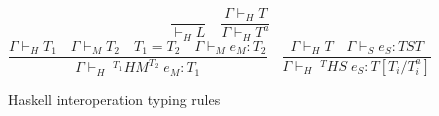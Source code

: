 \begin{figure}
\[
\frac{}{\vdash_{H}L}
\quad
\frac{\Gamma\vdash_{H}T}{\Gamma\vdash_{H}T^{a}}
\]
\bigskip
\[
\frac{\Gamma\vdash_{H}T_{1}\quad\Gamma\vdash_{M}T_{2}\quad T_{1}=T_{2}\quad\Gamma\vdash_{M}e_{M}:T_{2}}{\Gamma\vdash_{H}\;^{T_{1}}HM^{T_{2}}\;e_{M}:T_{1}}
\quad
\frac{\Gamma\vdash_{H}T\quad\Gamma\vdash_{S}e_{S}:TST}{\Gamma\vdash_{H}\;^{T}HS\;e_{S}:T[T_{i}/T^{a}_{i}]}
\]
\caption{Haskell interoperation typing rules}
\label{hitr}
\end{figure}